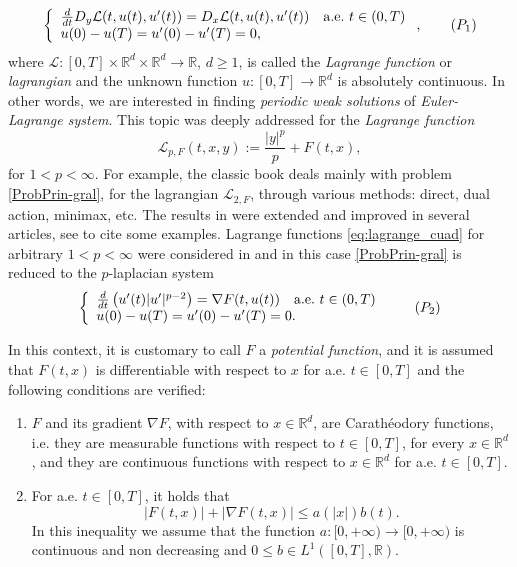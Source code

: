 \documentclass[twoside]{article}
\makeatletter
\theoremstyle{remark}
\newcommand{\labitem}[2]{%
\def\@itemlabel{\textbf{#1}}
\item
\def\@currentlabel{#1}\label{#2}}
\newcommand{\rr}{\mathbb{R}}
\renewcommand{\leq}{\leqslant}
\renewcommand{\geq}{\geqslant}
\newcounter{example}
\makeatother
\begin{document}
\begin{equation}\label{ProbPrin-gral}
    \left\{%
\begin{array}{ll}
  \frac{d}{dt} D_{y}\mathcal{L}(t,u(t),u'(t))= D_{x}\mathcal{L}(t,u(t),u'(t)) \quad \hbox{a.e.}\ t \in (0,T)\\
    u(0)-u(T)=u'(0)-u'(T)=0,
\end{array}%
\right. ,\tag{$P_1$}
\end{equation}
where $\mathcal{L}:[0,T]\times\rr^d\times\rr^d\to\rr$, $d\geq 1$, is called the \emph{Lagrange function} or \emph{lagrangian} and the unknown function  $u:[0,T]\to\rr^d$ is absolutely continuous. In other words, we are interested in  finding \emph{periodic weak solutions} of \emph{Euler-Lagrange system}. This topic was deeply addressed for the \emph{Lagrange function}
\begin{equation}\label{eq:lagrange_cuad}
\mathcal{L}_{p,F}(t,x,y):=\frac{|y|^p}{p}+F(t,x),
\end{equation}
for $1<p<\infty$. For example, the classic book  \cite{mawhin2010critical} deals mainly with problem \eqref{ProbPrin-gral}, for the lagrangian $\mathcal{L}_{2,F}$, through various methods: direct, dual action, minimax, etc. The results in \cite{mawhin2010critical} were extended and improved in several articles, see  \cite{tang1995periodic,tang1998periodic,wu1999periodic,tang2001periodic,zhao2004periodic}  to cite some examples. Lagrange functions \eqref{eq:lagrange_cuad} for arbitrary $1<p<\infty$ were considered in  \cite{Tian2007192,tang2010periodic} and in this case \eqref{ProbPrin-gral}  is reduced to the $p$-laplacian system
\begin{equation}\label{ProbP-lapla}
    \left\{%
\begin{array}{ll}
   \frac{d}{dt}\left(u'(t)|u'|^{p-2}\right) = \nabla F(t,u(t)) \quad \hbox{a.e.}\ t \in (0,T)\\
    u(0)-u(T)=u'(0)-u'(T)=0.
\end{array}%
\right.\tag{$P_2$}
\end{equation}


In this context, it  is customary to call $F$ a  \emph{potential function}, and it is assumed that $F(t,x)$ is differentiable with respect to $x$ for a.e. $t\in [0,T]$ and the following conditions are verified:
\begin{enumerate}
\labitem{(C)}{item:condicion_c} $F$ and its gradient $\nabla F$, with respect to $x\in\rr^d$,  are  Carath\'eodory functions, i.e. they are measurable functions with respect to $t\in [0,T]$, for every  $x\in\rr^d$, and they are continuous functions with  respect to  $x\in\rr^d$ for a.e. $t \in [0,T]$.
 \labitem{(A)}{item:condicion_a}  For   a.e. $t\in [0,T]$, it holds that
\begin{equation}
|F(t,x)| + |\nabla F(t,x)|  \leq a(|x|)b(t).
\end{equation}
In this inequality we assume that the function  $a:[0,+\infty)\to [0,+\infty)$ is continuous and non decreasing and $0\leq b\in L^1([0,T],\rr)$.
\end{enumerate}
\end{document}
